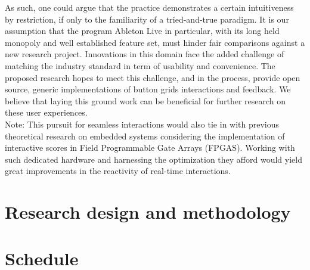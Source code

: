 \documentclass[journal,onecolumn]{IEEEtran}
\begin{document}
As such, one could argue that the practice demonstrates a certain intuitiveness by restriction, if only to the familiarity of a tried-and-true paradigm. It is our assumption that the program Ableton Live in particular, with its long held monopoly and well established feature set, must hinder fair comparisons against a new research project. Innovations in this domain face the added challenge of matching the industry standard in term of usability and convenience. The proposed research hopes to meet this challenge, and in the process, provide open source, generic implementations of button grids interactions and feedback. We believe that laying this ground work can be beneficial for further research on these user experiences. \\

Note: This pursuit for seamless interactions would also tie in with previous theoretical research on embedded systems considering the implementation of interactive scores in Field Programmable Gate Arrays (FPGAS)\cite{arias:fpga}. Working with such dedicated hardware and harnessing the optimization they afford would yield great improvements in the reactivity of real-time interactions\cite{popoff:fpga}. 



\section{Research design and methodology} %

\section{Schedule} %
\end{document}
